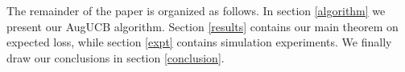 %

The remainder of the paper is organized as follows. In section \ref{algorithm} we present our AugUCB algorithm. 
Section \ref{results} contains our main theorem on expected loss, while section \ref{expt} contains simulation experiments. We finally draw our conclusions in section \ref{conclusion}.

